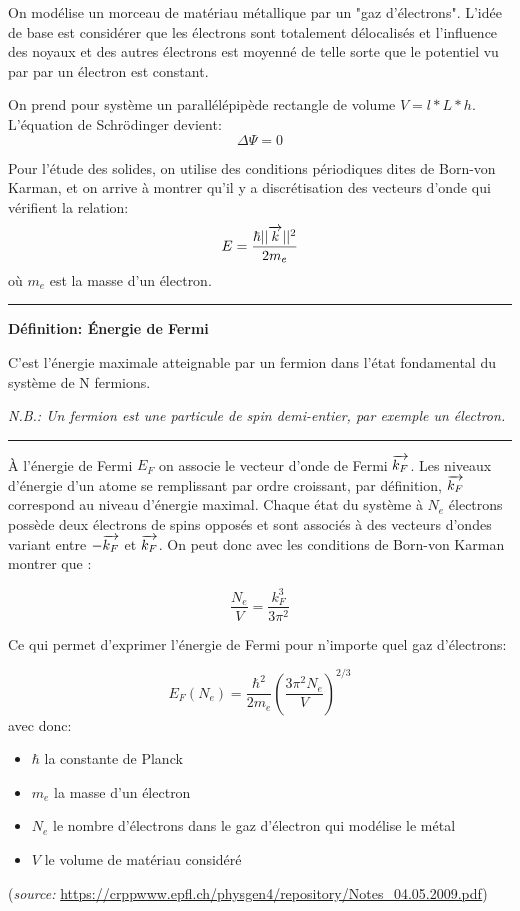 On modélise un morceau de matériau métallique par un "gaz d'électrons". L’idée de base est considérer que les électrons sont totalement délocalisés et l’influence des noyaux et des autres électrons est moyenné de telle sorte que le potentiel vu par par un électron est constant. 

On prend pour système un parallélépipède rectangle de volume $V = l*L*h$.
L'équation de Schrödinger devient:
$$\Delta \Psi = 0$$

Pour l'étude des solides, on utilise des conditions périodiques dites de Born-von Karman, et on arrive à montrer qu'il y a discrétisation des vecteurs d'onde qui vérifient la relation:
$$E = \frac{\hbar ||\overrightarrow{k}||^2}{2m_e}$$
où $m_e$ est la masse d'un électron.

\rule{\textwidth}{0.4pt}

\begin{center}
\textbf{Définition: Énergie de Fermi}
    
    C’est l’énergie maximale atteignable par un fermion dans l’état fondamental du système de N fermions.

\emph{N.B.: Un fermion est une particule de spin demi-entier, par exemple un électron.}    
\end{center}

\rule{\textwidth}{0.4pt}

À l'énergie de Fermi $E_F$ on associe le vecteur d'onde de Fermi $\overrightarrow{k_F}$. Les niveaux d'énergie d'un atome se remplissant par ordre croissant, par définition, $\overrightarrow{k_F}$ correspond au niveau d'énergie maximal. Chaque état du système à $N_e$ électrons possède deux électrons de spins opposés et sont associés à des vecteurs d'ondes variant entre $-\overrightarrow{k_F}$ et $\overrightarrow{k_F}$. On peut donc avec les conditions de Born-von Karman montrer que :

$$\frac{N_e}{V} = \frac{k_F^3}{3\pi^2}$$

Ce qui permet d'exprimer l'énergie de Fermi pour n'importe quel gaz d'électrons:


    $$E_F(N_e) = \frac{\hbar^2}{2m_e} \left(\frac{3\pi^2N_e}{V}\right)^{2/3}$$
avec donc:
    \begin{itemize}
        \item $\hbar$ la constante de Planck
        \item $m_e$ la masse d'un électron
        \item $N_e$ le nombre d'électrons dans le gaz d'électron qui modélise le métal
        \item $V$ le volume de matériau considéré
    \end{itemize}
(\emph{source: }\url{https://crppwww.epfl.ch/physgen4/repository/Notes_04.05.2009.pdf})

